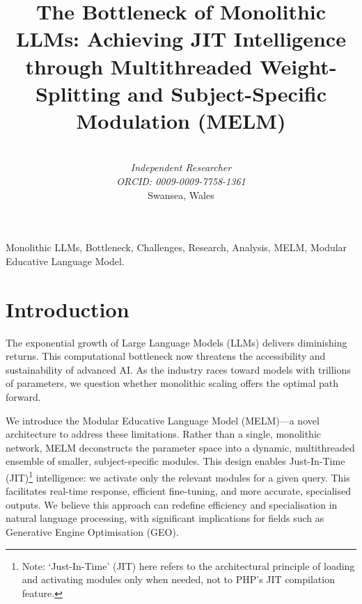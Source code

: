 \documentclass[conference]{IEEEtran}
\begin{document}
\title{The Bottleneck of Monolithic LLMs: Achieving JIT Intelligence through Multithreaded Weight-Splitting and Subject-Specific Modulation (MELM)}

\author{
	\\
		\textit{Independent Researcher}\\
		\textit{ORCID: 0009-0009-7758-1361}\\
		Swansea, Wales}

\maketitle
\thispagestyle{plain}
\pagestyle{plain}

\begin{abstract}
\end{abstract}

\begin{IEEEkeywords}
	Monolithic LLMs, Bottleneck, Challenges, Research, Analysis, MELM, Modular Educative Language Model.
\end{IEEEkeywords}

\section{Introduction}
	The exponential growth of Large Language Models (LLMs) delivers diminishing returns. This computational bottleneck now threatens the accessibility and sustainability of advanced AI. As the industry races toward models with trillions of parameters, we question whether monolithic scaling offers the optimal path forward.

	We introduce the Modular Educative Language Model (MELM)—a novel architecture to address these limitations. Rather than a single, monolithic network, MELM deconstructs the parameter space into a dynamic, multithreaded ensemble of smaller, subject-specific modules. This design enables Just-In-Time (JIT)\footnote{\label{note:jit}Note: `Just-In-Time' (JIT) here refers to the architectural principle of loading and activating modules only when needed, not to PHP's JIT compilation feature.} intelligence: we activate only the relevant modules for a given query. This facilitates real-time response, efficient fine-tuning, and more accurate, specialised outputs. We believe this approach can redefine efficiency and specialisation in natural language processing, with significant implications for fields such as Generative Engine Optimisation (GEO).
\end{document}
